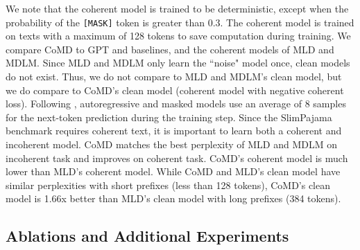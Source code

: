 \documentclass{article} %
\begin{document}
We note that the coherent model is trained to be deterministic, except when the probability of the \texttt{[MASK]} token is greater than 0.3. The coherent model is trained on texts with a maximum of 128 tokens to save computation during training. We compare CoMD to GPT and baselines, and the coherent models of MLD and MDLM. Since MLD and MDLM only learn the ``noise" model once, clean models do not exist. Thus, we do not compare to MLD and MDLM's clean model, but we do compare to CoMD's clean model (coherent model with negative coherent loss). Following \citet{nie2024scaling}, autoregressive and masked models use an average of 8 samples for the next-token prediction during the training step. Since the SlimPajama benchmark requires coherent text, it is important to learn both a coherent and incoherent model. CoMD matches the best perplexity of MLD and MDLM on incoherent task and improves on coherent task. CoMD's coherent model is much lower than MLD's coherent model. While CoMD and MLD's clean model have similar perplexities with short prefixes (less than 128 tokens), CoMD's clean model is 1.66x better than MLD's clean model with long prefixes (384 tokens). 


\subsection{Ablations and Additional Experiments}
\end{document}
